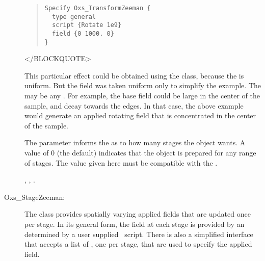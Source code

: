 \begin{description}
\begin{quote}
\begin{verbatim}
Specify Oxs_TransformZeeman {
  type general
  script {Rotate 1e9}
  field {0 1000. 0}
}
\end{verbatim}
\end{quote}
\begin{rawhtml}
</BLOCKQUOTE>
\end{rawhtml}
This particular effect could be obtained using the
 class, because the  is uniform.
But the field was taken uniform only to simplify the example.  The
 may be any .  For
example, the base field could be large in the center of the sample, and
decay towards the edges.  In that case, the above example would generate
an applied rotating field that is concentrated in the center of the
sample.

The  parameter informs the
 as to how many stages the
 object wants.  A value of 0 (the default)
indicates that the object is prepared for any range of stages.  The
 value given here must be compatible with the
.

\begin{ExampleMifs}
  , , .
\end{ExampleMifs}

\item[Oxs\_StageZeeman:]
%
   The  class provides spatially varying applied
   fields that are updated once per stage.  In its general form, the
   field at each stage is provided by an 
   determined by a user supplied \Tcl\ script.  There is also a
   simplified interface that accepts a list of , one per
   stage, that are used to specify the applied field.


\end{description}
